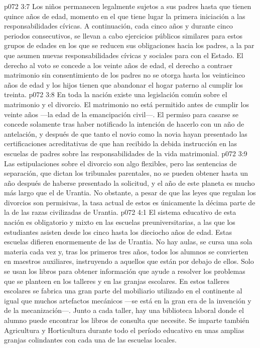 \vs p072 3:7 \pc Los niños permanecen legalmente sujetos a sus padres hasta que tienen quince años de edad, momento en el que tiene lugar la primera iniciación a las responsabilidades cívicas. A continuación, cada cinco años y durante cinco periodos consecutivos, se llevan a cabo ejercicios públicos similares para estos grupos de edades en los que se reducen sus obligaciones hacia los padres, a la par que asumen nuevas responsabilidades cívicas y sociales para con el Estado. El derecho al voto se concede a los veinte años de edad, el derecho a contraer matrimonio sin consentimiento de los padres no se otorga hasta los veinticinco años de edad y los hijos tienen que abandonar el hogar paterno al cumplir los treinta.
\vs p072 3:8 En toda la nación existe una legislación común sobre el matrimonio y el divorcio. El matrimonio no está permitido antes de cumplir los veinte años ---la edad de la emancipación civil---. El permiso para casarse se concede solamente tras haber notificado la intención de hacerlo con un año de antelación, y después de que tanto el novio como la novia hayan presentado las certificaciones acreditativas de que han recibido la debida instrucción en las escuelas de padres sobre las responsabilidades de la vida matrimonial.
\vs p072 3:9 Las estipulaciones sobre el divorcio son algo flexibles, pero las sentencias de separación, que dictan los tribunales parentales, no se pueden obtener hasta un año después de haberse presentado la solicitud, y el año de este planeta es mucho más largo que el de Urantia. No obstante, a pesar de que las leyes que regulan los divorcios son permisivas, la tasa actual de estos es únicamente la décima parte de la de las razas civilizadas de Urantia.
\vs p072 4:1 El sistema educativo de esta nación es obligatorio y mixto en las escuelas preuniversitarias, a las que los estudiantes asisten desde los cinco hasta los dieciocho años de edad. Estas escuelas difieren enormemente de las de Urantia. No hay aulas, se cursa una sola materia cada vez y, tras los primeros tres años, todos los alumnos se convierten en maestros auxiliares, instruyendo a aquellos que están por debajo de ellos. Solo se usan los libros para obtener información que ayude a resolver los problemas que se planteen en los talleres y en las granjas escolares. En estos talleres escolares se fabrica una gran parte del mobiliario utilizado en el continente al igual que muchos artefactos mecánicos ---se está en la gran era de la invención y de la mecanización---. Junto a cada taller, hay una biblioteca laboral donde el alumno puede encontrar los libros de consulta que necesite. Se imparte también Agricultura y Horticultura durante todo el período educativo en unas amplias granjas colindantes con cada una de las escuelas locales.
